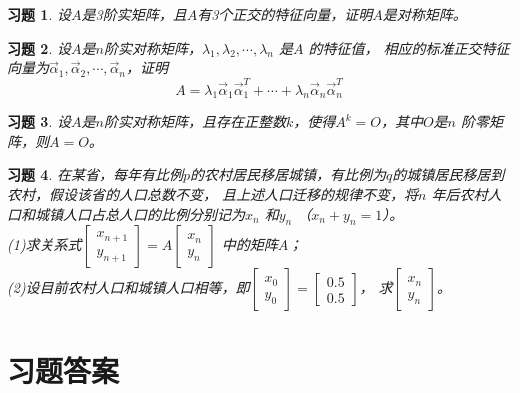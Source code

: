 \documentclass[a4paper]{book}
\newtheorem{ex}{习题}[chapter]
\begin{document}
\begin{ex}\label{7.25}
设$A$是3阶实矩阵，且$A$有3个正交的特征向量，证明$A$是对称矩阵。
\end{ex}

\begin{ex}\label{7.26}
设$A$是$n$阶实对称矩阵，$\lambda_1,\lambda_2,\cdots,\lambda_n$ 是$A$ 的特征值，
相应的标准正交特征向量为$\vec{\alpha}_1,\vec{\alpha}_2,\cdots,\vec{\alpha}_n$，证明
\begin{equation*}
  A = \lambda_1\vec{\alpha}_1\vec{\alpha}_1^T+\cdots+\lambda_n\vec{\alpha}_n\vec{\alpha}_n^T
\end{equation*}
\end{ex}

\begin{ex}\label{7.27}
设$A$是$n$阶实对称矩阵，且存在正整数$k$，使得$A^{k}=O$，其中$O$是$n$ 阶零矩阵，则$A=O$。
\end{ex}

\begin{ex}\label{7.28}
在某省，每年有比例$p$的农村居民移居城镇，有比例为$q$的城镇居民移居到农村，假设该省的人口总数不变，
且上述人口迁移的规律不变，将$n$ 年后农村人口和城镇人口占总人口的比例分别记为$x_n$ 和$y_n$ （$x_n+y_n=1$）。\\
(1)求关系式$\begin{bmatrix}x_{n+1}\\y_{n+1}\end{bmatrix}=A\begin{bmatrix}x_n\\y_n\end{bmatrix}$ 中的矩阵$A$；\\
(2)设目前农村人口和城镇人口相等，即$\begin{bmatrix}x_0\\y_0\end{bmatrix}=\begin{bmatrix}0.5\\0.5\end{bmatrix}$，
求$\begin{bmatrix}x_{n}\\y_{n}\end{bmatrix}$。
\end{ex}


\section{习题答案}
\end{document}

